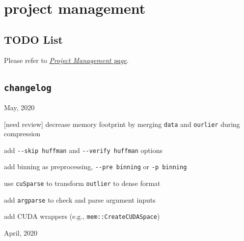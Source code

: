 \section{project management}

\subsection{TODO List}

Please refer to
\href{https://github.com/hipdac-lab/cuSZ/projects/2}{\emph{Project
Management page}}.

\subsection{\texorpdfstring{\texttt{changelog}}{changelog}}

May, 2020

\begin{description}
\tightlist
\item[perf]
{[}need review{]} decrease memory footprint by merging
\passthrough{\lstinline!data!} and \passthrough{\lstinline!ourlier!}
during compression
\item[feature]
add \passthrough{\lstinline!--skip huffman!} and
\passthrough{\lstinline!--verify huffman!} options
\item[feature]
add binning as preprocessing, \passthrough{\lstinline!--pre binning!} or
\passthrough{\lstinline!-p binning!}
\item[prototype]
use \passthrough{\lstinline!cuSparse!} to transform
\passthrough{\lstinline!outlier!} to dense format
\item[feature]
add \passthrough{\lstinline!argparse!} to check and parse argument
inputs
\item[refactor]
add CUDA wrappers (e.g., \passthrough{\lstinline!mem::CreateCUDASpace!})
\end{description}

April, 2020

